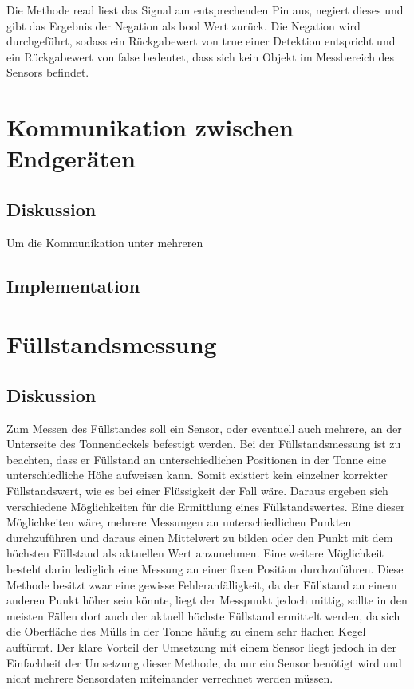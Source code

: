        Die Methode read liest das Signal am entsprechenden Pin aus, negiert dieses und gibt das Ergebnis der Negation als bool Wert zurück. Die Negation wird durchgeführt, sodass ein Rückgabewert von true einer Detektion entspricht und ein Rückgabewert von false bedeutet, dass sich kein Objekt im Messbereich des Sensors befindet.

\section{Kommunikation zwischen Endgeräten} \label{communications}

    \subsection{Diskussion}
        Um die Kommunikation unter mehreren 

    \subsection{Implementation}

\section{Füllstandsmessung}
    \subsection{Diskussion}
        Zum Messen des Füllstandes soll ein Sensor, oder eventuell auch mehrere, an der Unterseite des Tonnendeckels befestigt werden. Bei der Füllstandsmessung ist zu beachten, dass er Füllstand an unterschiedlichen Positionen in der Tonne eine unterschiedliche Höhe aufweisen kann. Somit existiert kein einzelner korrekter Füllstandswert, wie es bei einer Flüssigkeit der Fall wäre. Daraus ergeben sich verschiedene Möglichkeiten für die Ermittlung eines Füllstandswertes. Eine dieser Möglichkeiten wäre, mehrere Messungen an unterschiedlichen Punkten durchzuführen und daraus einen Mittelwert zu bilden oder den Punkt mit dem höchsten Füllstand als aktuellen Wert anzunehmen. Eine weitere Möglichkeit besteht darin lediglich eine Messung an einer fixen Position durchzuführen. Diese Methode besitzt zwar eine gewisse Fehleranfälligkeit, da der Füllstand an einem anderen Punkt höher sein könnte, liegt der Messpunkt jedoch mittig, sollte in den meisten Fällen dort auch der aktuell höchste Füllstand ermittelt werden, da sich die Oberfläche des Mülls in der Tonne häufig zu einem sehr flachen Kegel auftürmt. Der klare Vorteil der Umsetzung mit einem Sensor liegt jedoch in der Einfachheit der Umsetzung dieser Methode, da nur ein Sensor benötigt wird und nicht mehrere Sensordaten miteinander verrechnet werden müssen.\\
        

